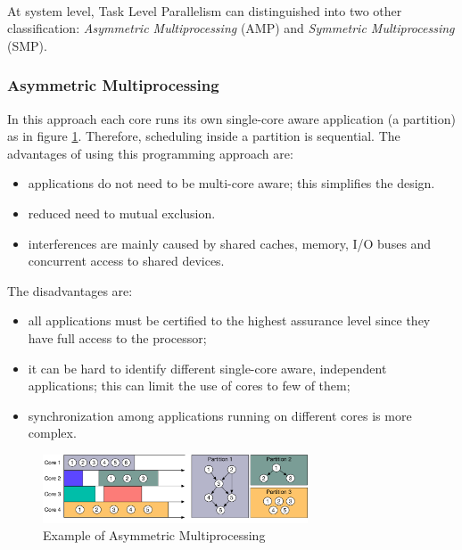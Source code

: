 \paragraph{} At system level, Task Level Parallelism can distinguished into two other classification: \emph{Asymmetric Multiprocessing} (AMP) and \emph{Symmetric Multiprocessing} (SMP).

\subsubsection{Asymmetric Multiprocessing}
In this approach each core runs its own single-core aware application (a partition) as in figure \ref{fig:AMP}. Therefore, scheduling inside a partition is sequential. The advantages of using this programming approach are:
\begin{itemize}
\item applications do not need to be multi-core aware; this simplifies the design.
\item reduced need to mutual exclusion.
\item interferences are mainly caused by shared caches, memory, I/O buses and concurrent access to shared devices.
\end{itemize}
The disadvantages are:
\begin{itemize}
\item all applications must be certified to the highest assurance level since they have full access to the processor;
\item it can be hard to identify different single-core aware, independent applications; this can limit the use of cores to few of them;
\item synchronization among applications running on different cores is more complex.
\end{itemize}

\begin{figure}[htbp]
  \centering
  \includegraphics[width=0.7\textwidth]{AMP}
  \caption{Example of Asymmetric Multiprocessing}
  \label{fig:AMP}
\end{figure}

